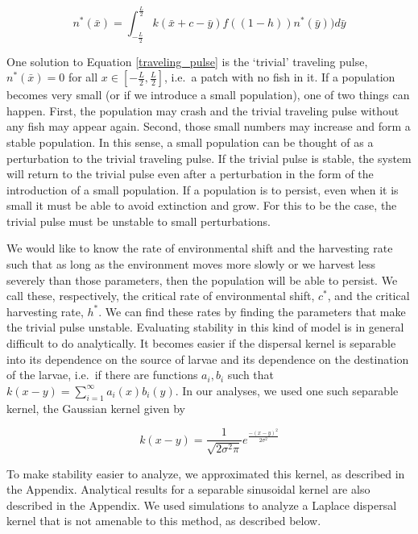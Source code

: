 \documentclass[]{article}
\begin{document}
\begin{equation}
n^*(\bar{x})=\int^{\frac{L}{2}}_{-\frac{L}{2}}k(\bar{x}+c-\bar{y})f((1-h))n^*(\bar{y}))d
\bar{y} \label{traveling_pulse}
\end{equation}

One solution to Equation \ref{traveling_pulse} is the `trivial' traveling pulse, $n^*(\bar{x}) = 0$ for all $x \in \left[-\frac{L}
{2}, \frac{L}{2}\right]$, i.e.~a patch with no fish in it. If a population becomes very small (or if we introduce a small 
population), one of two things can happen. First, the population may crash and the trivial traveling pulse 
without any fish may appear again. Second, those small numbers may increase and form a stable population. 
In this sense, a small population can be thought of as a perturbation to the trivial traveling pulse. If the trivial 
pulse is stable, the system will return to the trivial pulse even after a perturbation in the form of the introduction 
of a small population. If a population is to persist, even when it is small it must be able to avoid extinction and 
grow. For this to be the case, the trivial pulse must be unstable to small perturbations.  

We would like to know the rate of environmental shift and the harvesting rate such that as long as the 
environment moves more slowly or we harvest less severely than those parameters, then the population will be able to persist. 
We call these, respectively, the critical rate of environmental shift, $c^*$, and the critical harvesting rate, $h^*$. 
We can find these rates by finding the parameters that make the trivial pulse unstable. Evaluating stability in this kind of model is in 
general difficult to do analytically. It becomes easier if the dispersal kernel is separable into its dependence on the 
source of larvae and its dependence on the destination of the larvae,
i.e.~if there are functions $a_i, b_i$ such that $k(x- y) = \sum^\infty_{i=1} a_i(x)b_i(y)$.  In our analyses, we used one such separable kernel, the Gaussian kernel given by

\[k(x-y)=\frac{1}{\sqrt{2\sigma^2\pi}}e^{\frac{-(x-y)^2}{2\sigma^2}}\]

\noindent To make stability easier to analyze, we approximated this kernel, as described in the Appendix.  Analytical results for a separable sinusoidal kernel are also described in the Appendix.  We used 
simulations to analyze a Laplace dispersal kernel that is not amenable to this method, as described below.
\end{document}
